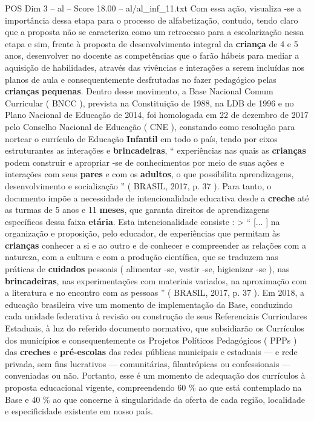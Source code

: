 \begin{textsample}{POS Dim 3 – al – Score 18.00 – al/al\_inf\_11.txt}
Com essa ação, visualiza -se a importância dessa etapa para o processo de alfabetização, contudo, tendo claro que a proposta não se caracteriza como um retrocesso para a escolarização nessa etapa e sim, frente à proposta de desenvolvimento integral da \textbf{criança} de 4 e 5 anos, desenvolver no docente as competências que o farão hábeis para mediar a aquisição de habilidades, através das vivências e interações a serem incluídas nos planos de aula e consequentemente desfrutadas no fazer pedagógico pelas \textbf{crianças} \textbf{pequenas}.
Dentro desse movimento, a Base Nacional Comum Curricular ( BNCC ), prevista na Constituição de 1988, na LDB de 1996 e no Plano Nacional de Educação de 2014, foi homologada em 22 de dezembro de 2017 pelo Conselho Nacional de Educação ( CNE ), constando como resolução para nortear o currículo de Educação \textbf{Infantil} em todo o país, tendo por eixos estruturantes as interações e \textbf{brincadeiras}, “ experiências nas quais as \textbf{crianças} podem construir e apropriar -se de conhecimentos por meio de suas ações e interações com seus \textbf{pares} e com os \textbf{adultos}, o que possibilita aprendizagens, desenvolvimento e socialização ” ( BRASIL, 2017, p. 37 ).
Para tanto, o documento impõe a necessidade de intencionalidade educativa desde a \textbf{creche} até as turmas de 5 anos e 11 \textbf{meses}, que garanta direitos de aprendizagens específicos dessa faixa \textbf{etária}.
Esta intencionalidade consiste : > “ [... ] na organização e proposição, pelo educador, de experiências que permitam às \textbf{crianças} conhecer a si e ao outro e de conhecer e compreender as relações com a natureza, com a cultura e com a produção científica, que se traduzem nas práticas de \textbf{cuidados} pessoais ( alimentar -se, vestir -se, higienizar -se ), nas \textbf{brincadeiras}, nas experimentações com materiais variados, na aproximação com a literatura e no encontro com as pessoas ” ( BRASIL, 2017, p. 37 ).
Em 2018, a educação brasileira vive um momento de implementação da Base, conduzindo cada unidade federativa à revisão ou construção de seus Referenciais Curriculares Estaduais, à luz do referido documento normativo, que subsidiarão os Currículos dos municípios e consequentemente os Projetos Políticos Pedagógicos ( PPPs ) das \textbf{creches} e \textbf{pré-escolas} das redes públicas municipais e estaduais — e rede privada, sem fins lucrativos — comunitárias, filantrópicas ou confessionais — conveniadas ou não.
Portanto, esse é um momento de adequação dos currículos à proposta educacional vigente, compreendendo 60 \% ao que está contemplado na Base e 40 \% ao que concerne à singularidade da oferta de cada região, localidade e especificidade existente em nosso país.

\end{textsample}

